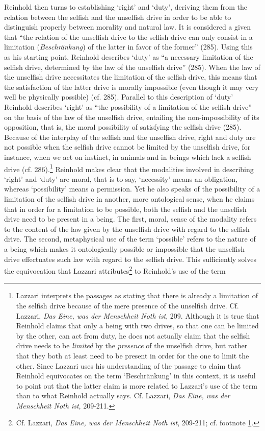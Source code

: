  Reinhold then turns to establishing `right' and `duty', deriving them from the relation between the selfish and the unselfish drive in order to be able to distinguish properly between morality and natural law. It is considered a given that ``the relation of the unselfish drive to the selfish drive can only consist in a limitation (\textit{Beschr\"{a}nkung}) of the latter in favor of the former'' (285). Using this as his starting point, Reinhold describes `duty' as ``a necessary limitation of the selfish drive, determined by the law of the unselfish drive'' (285). When the law of the unselfish drive necessitates the limitation of the selfish drive, this means that the satisfaction of the latter drive is morally impossible (even though it may very well be physically possible) (cf. 285). Parallel to this description of `duty' Reinhold describes `right' as ``the possibility of a limitation of the selfish drive'' on the basis of the law of the unselfish drive, entailing the non{-}impossibility of its opposition, that is, the moral possibility of satisfying the selfish drive (285). Because of the interplay of the selfish and the unselfish drive, right and duty are not possible when the selfish drive cannot be limited by the unselfish drive, for instance, when we act on instinct, in animals and in beings which lack a selfish drive (cf. 286).\footnote{\label{footnote:_Ref225931208} Lazzari interprets the passages as stating that there is already a limitation of the selfish drive because of the mere presence of the unselfish drive. Cf. Lazzari, \textit{Das Eine, was der Menschheit Noth ist}, 209. Although it is true that Reinhold claims that only a being with two drives, so that one can be limited by the other, can act from duty, he does not actually claim that the selfish drive needs to be \textit{limited} by the \textit{presence }of the unselfish drive, but rather that they both at least need to be present in order for the one to limit the other. Since Lazzari uses his understanding of the passage to claim that Reinhold equivocates on the term `Beschr\"{a}nkung' in this context, it is useful to point out that the latter claim is more related to Lazzari's use of the term than to what Reinhold actually says. Cf. Lazzari, \textit{Das Eine, was der Menschheit Noth ist}, 209{-}211. } Reinhold makes clear that the modalities involved in describing `right' and `duty' are moral, that is to say, `necessity' means an obligation, whereas `possibility' means a permission. Yet he also speaks of the possibility of a limitation of the selfish drive in another, more ontological sense, when he claims that in order for a limitation to be possible, both the selfish and the unselfish drive need to be present in a being. The first, moral, sense of the modality refers to the content of the law given by the unselfish drive with regard to the selfish drive. The second, metaphysical use of the term `possible' refers to the nature of a being which makes it ontologically possible or impossible that the unselfish drive effectuates such law with regard to the selfish drive. This sufficiently solves the equivocation that Lazzari attributes\footnote{ Cf. Lazzari, \textit{Das Eine, was der Menschheit Noth ist}, 209{-}211; cf. footnote \ref{footnote:_Ref225931208}. } to Reinhold's use of the term 